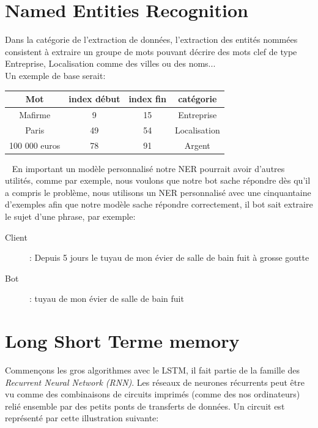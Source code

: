 \pagebreak
\section{Named Entities Recognition}
Dans la catégorie de l'extraction de données, l'extraction des entités nommées consistent à extraire un groupe de mots pouvant décrire des mots clef de type Entreprise, Localisation comme des villes ou des noms...\\
Un exemple de base serait:\\


\begin{tabular}{c|cc|c}
Mot & index début & index fin & catégorie \\
\hline
Mafirme & 9 & 15 & Entreprise\\
Paris & 49 & 54 & Localisation\\
100 000 euros & 78 & 91 & Argent\\
\end{tabular}

\ \linebreak
En important un modèle personnalisé notre NER pourrait avoir d'autres utilités, comme par exemple,  nous voulons que notre bot sache répondre dès qu'il  a compris le problème, nous utilisons un NER personnalisé avec une cinquantaine d'exemples afin que notre modèle sache répondre correctement, il bot sait extraire le sujet d'une phrase, par exemple:

\begin{description}
\item[Client]: Depuis 5 jours le tuyau de mon évier de salle de bain fuit à grosse goutte
\item[Bot]: tuyau de mon évier de salle de bain fuit
\end{description}

\pagebreak
\section{Long Short Terme memory}
Commençons les gros algorithmes avec le LSTM, il fait partie de la famille des \textit{Recurrent Neural Network (RNN)}. Les réseaux de neurones récurrents peut être vu comme des combinaisons de circuits imprimés (comme des nos ordinateurs) relié ensemble par des petits ponts de transferts de données. 
Un circuit est représenté par cette illustration suivante:

